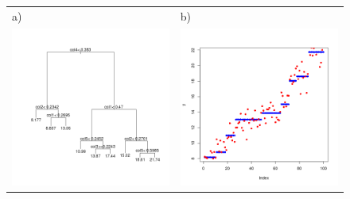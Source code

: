 \documentclass[10pt,letterpaper]{article}
\begin{document}



\begin{figure}[tbhp]
\begin{tabular}{ll}
a)& b)\\
 \includegraphics[totalheight=6cm]{./figs/tree_function.png}&
  \includegraphics[totalheight=6cm]{./figs/noisy_tree_function.png}

\end{tabular}
\end{figure}
\end{document}
